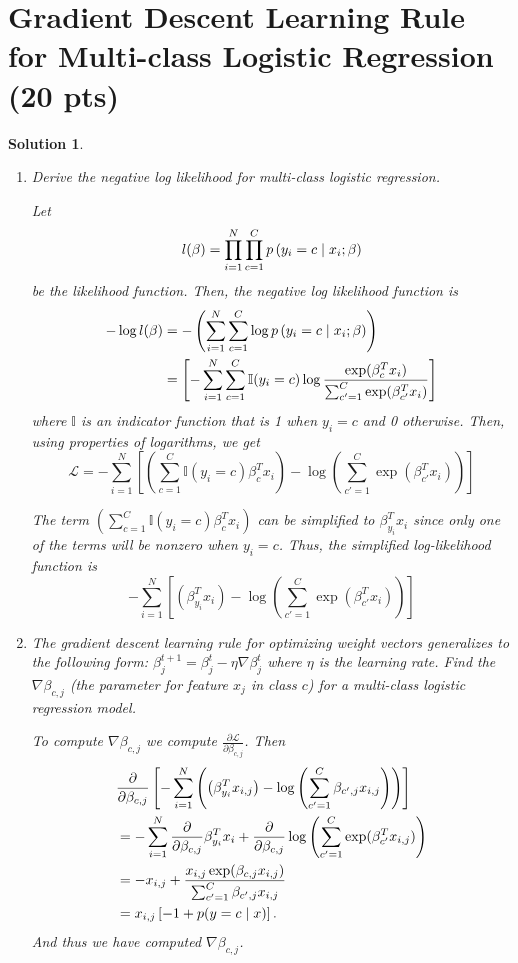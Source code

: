 \documentclass[12pt]{article}
\newcommand{\Ib}{\mathbb{I}}
\newcommand{\setst}{\hspace{1mm} | \hspace{1mm} }
\newcommand{\pii}[1]{\exp(\beta_{#1}^Tx_i)}
\newcommand{\spii}[1]{\sum_{#1 = 1}^C\exp(\beta_{#1}^Tx_i)}
\newcommand{\spij}[1]{\sum_{#1 = 1}^C\exp(\beta_{#1}^Tx_{i,j})}
\newcommand{\dpp}{\partial}
\newtheorem*{solution*}{Solution}
\theoremstyle{definition}
\begin{document}
\section{ Gradient Descent Learning Rule for Multi-class Logistic Regression (20 pts)}
	\begin{solution*}\leavevmode
		\begin{enumerate}[label=\arabic*.,font=\upshape]
			\item \textnormal{Derive the negative log likelihood for multi-class logistic regression.}
			
			Let 
			\[l(\beta) = \prod_{i=1}^{N}\prod_{c=1}^{C} p \left(y_i = c \setst x_i; \beta\right)\]
			be the likelihood function. Then, the negative log likelihood function is
			\begin{align*}
			-\log l(\beta) &= -\left(\sum_{i=1}^{N}\sum_{c=1}^{C} \log p \left(y_i = c \setst x_i; \beta\right)\right) \\
			&= \left[-\sum_{i=1}^{N}\sum_{c=1}^{C} \Ib(y_i = c)\log \frac{\pii{c}}{\spii{c'}}\right]
			\end{align*}
			where $\Ib$ is an indicator function that is 1 when $y_i = c$ and 0 otherwise. Then, using properties of logarithms, we get
			\[\mathscr{L} = -\sum_{i=1}^{N} \left[\left(\sum_{c=1}^{C} \Ib(y_i = c) \beta_c^Tx_i\right) - \log \left(\spii{c'}\right)\right]\]
			
			The term $\left(\sum_{c=1}^{C} \Ib(y_i = c) \beta_c^Tx_i\right)$ can be simplified to $\beta_{y_i}^Tx_i $ since only one of the terms will be nonzero when $y_i = c$. Thus, the simplified log-likelihood function is
			\[ -\sum_{i=1}^{N} \left[\left(\beta_{y_i}^Tx_i\right) - \log \left(\spii{c'}\right)\right]\]
			
			\item \textnormal{The gradient descent learning rule for optimizing weight vectors generalizes to the following form: $\beta^{t+1}_j = \beta^t_j - \eta \nabla \beta^t_j$ where $\eta$ is the learning rate. Find the $\nabla\beta_{c,j}$ (the parameter for
				feature $x_j$ in class $c$) for a multi-class logistic regression model.}
			
			To compute $\nabla\beta_{c,j}$ we compute $\frac{\partial \mathscr{L}}{\partial \beta_{c,j}}$.
			Then
			\begin{align*}
			&\frac{\dpp}{\dpp \beta_{c,j}}\left[ -\sum_{i=1}^{N} \left(\left(\beta_{y_i}^Tx_{i,j}\right) - \log \left(\sum_{c'=1}^C\beta_{c',j}x_{i,j}\right)\right)\right] \\
			&= -\sum_{i=1}^N \frac{\dpp}{\dpp \beta_{c,j}} \beta_{y_i}^Tx_i + \frac{\dpp}{\dpp \beta_{c,j}} \log \left(\spij{c'}\right)\\
			&= -x_{i,j} + \frac{x_{i,j}\exp(\beta_{c,j}x_{i,j})}{\sum_{c'=1}^C\beta_{c',j}x_{i,j}}\\
			&= x_{i,j}\left[-1+p(y = c \setst x)\right].
			\end{align*}
			And thus we have computed  $\nabla\beta_{c,j}$. 
		\end{enumerate}
	\end{solution*}
\end{document}
